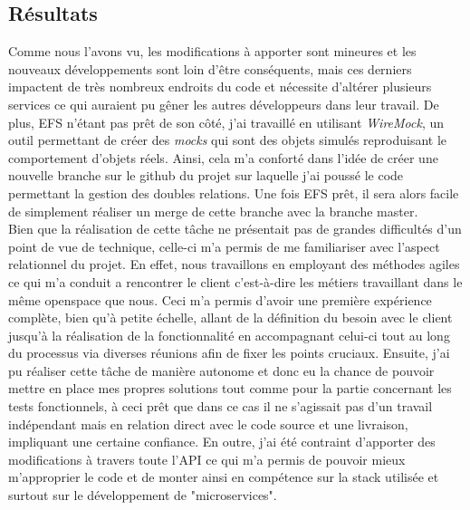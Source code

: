 \subsection{Résultats}

	Comme nous l'avons vu, les modifications à apporter sont mineures et les nouveaux développements sont loin d'être conséquents, mais ces derniers impactent de très nombreux endroits du code et nécessite d'altérer plusieurs services ce qui auraient pu gêner les autres développeurs dans leur travail. De plus, EFS n'étant pas prêt de son côté, j'ai travaillé en utilisant \textit{WireMock}, un outil permettant de créer des \textit{mocks} qui sont des objets simulés reproduisant le comportement d'objets réels. Ainsi, cela m'a conforté dans l'idée de créer une nouvelle branche sur le github du projet sur laquelle j'ai poussé le code permettant la gestion des doubles relations. Une fois EFS prêt, il sera alors facile de simplement réaliser un merge de cette branche avec la branche master. \\
	
	Bien que la réalisation de cette tâche ne présentait pas de grandes difficultés d'un point de vue de technique, celle-ci m'a permis de me familiariser avec l'aspect relationnel du projet. En effet, nous travaillons en employant des méthodes agiles ce qui m'a conduit a rencontrer le client c'est-à-dire les métiers travaillant dans le même openspace que nous. Ceci m'a permis d'avoir une première expérience complète, bien qu'à petite échelle, allant de la définition du besoin avec le client jusqu'à la réalisation de la fonctionnalité en accompagnant celui-ci tout au long du processus via diverses réunions afin de fixer les points cruciaux. Ensuite, j'ai pu réaliser cette tâche de manière autonome et donc eu la chance de pouvoir mettre en place mes propres solutions tout comme pour la partie concernant les tests fonctionnels, à ceci prêt que dans ce cas il ne s'agissait pas d'un travail indépendant mais en relation direct avec le code source et une livraison, impliquant une certaine confiance.
	En outre, j'ai été contraint d'apporter des modifications à travers toute l'API ce qui m'a permis de pouvoir mieux m'approprier le code et de monter ainsi en compétence sur la stack utilisée et surtout sur le développement de "microservices".